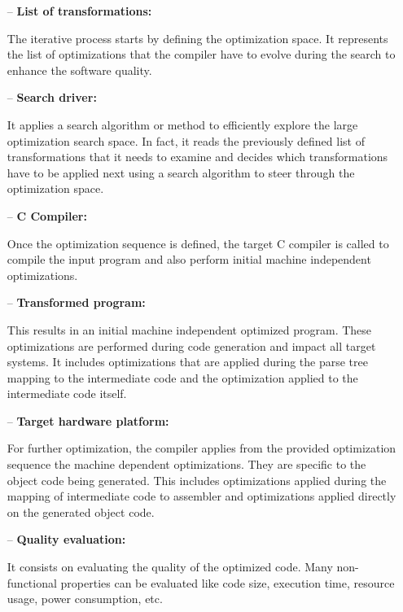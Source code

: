 \begin{itemize}
	\item[--] \textbf{List of transformations:}
	
	The iterative process starts by defining the optimization space. It represents the list of optimizations that the compiler have to evolve during the search to enhance the software quality.
	
	\item[--] \textbf{Search driver:}
	
	It applies a search algorithm or method to efficiently explore the large optimization search space. In fact, it reads the previously defined list of transformations that it needs to examine and decides which transformations have to be applied next using a search algorithm
	to steer through the optimization space.
	
	\item[--] \textbf{C Compiler:}
	
	Once the optimization sequence is defined, the target C compiler is called to compile the input program and also perform initial machine independent optimizations. 
	
	\item[--] \textbf{Transformed program:}
	
	This results in an initial machine independent optimized program. These optimizations are performed during code generation and impact all target systems. It includes optimizations that are applied during the parse tree mapping to the intermediate code and the optimization applied to the intermediate code itself.
	
	\item[--] \textbf{Target hardware platform:}
	
	For further optimization, the compiler applies from the provided optimization sequence the machine dependent optimizations. They are specific to the object code being generated. This includes optimizations applied during the mapping of intermediate code to assembler and optimizations applied directly on the generated object code.
	
	\item[--] \textbf{Quality evaluation:}
	
	It consists on evaluating the quality of the optimized code. Many non-functional properties can be evaluated like code size, execution time, resource usage, power consumption, etc.
	
\end{itemize}


